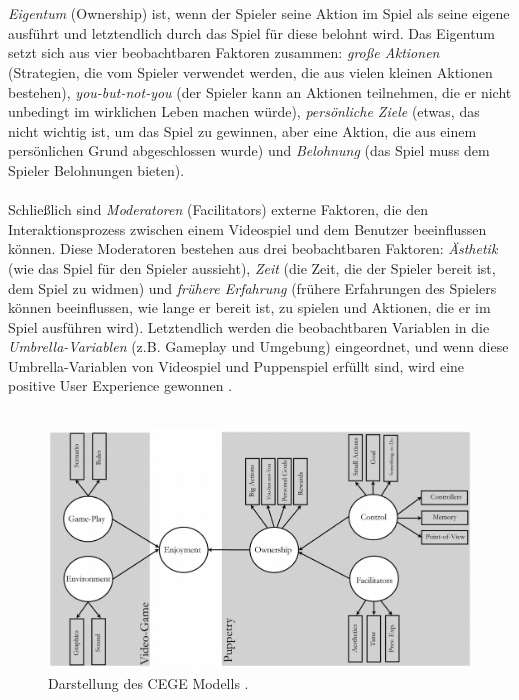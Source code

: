 \documentclass[a4paper,12pt]{scrartcl}
\begin{document}
\\\\
\textit{Eigentum} (Ownership) ist, wenn der Spieler seine Aktion im Spiel als seine eigene ausführt und letztendlich durch das Spiel für diese belohnt wird. Das Eigentum setzt sich aus vier beobachtbaren Faktoren zusammen: \textit{große Aktionen} (Strategien, die vom Spieler verwendet werden, die aus vielen kleinen Aktionen bestehen), \textit{you-but-not-you} (der Spieler kann an Aktionen teilnehmen, die er nicht unbedingt im wirklichen Leben machen würde), \textit{persönliche Ziele} (etwas, das nicht wichtig ist, um das Spiel zu gewinnen, aber eine Aktion, die aus einem persönlichen Grund abgeschlossen wurde) und \textit{Belohnung} (das Spiel muss dem Spieler Belohnungen bieten). 
\\\\
Schließlich sind \textit{Moderatoren} (Facilitators) externe Faktoren, die den Interaktionsprozess zwischen einem Videospiel und dem Benutzer beeinflussen können. Diese Moderatoren bestehen aus drei beobachtbaren Faktoren: \textit{Ästhetik} (wie das Spiel für den Spieler aussieht), \textit{Zeit} (die Zeit, die der Spieler bereit ist, dem Spiel zu widmen) und \textit{frühere Erfahrung} (frühere Erfahrungen des Spielers können beeinflussen, wie lange er bereit ist, zu spielen und Aktionen, die er im Spiel ausführen wird). Letztendlich werden die beobachtbaren Variablen in die \textit{Umbrella-Variablen} (z.B. Gameplay und Umgebung) eingeordnet, und wenn diese Umbrella-Variablen von Videospiel und Puppenspiel erfüllt sind, wird eine positive User Experience gewonnen 
\cite{CEGE2016}.
\\\\
\begin{figure}[h!]
\begin{center}
\includegraphics[scale = 0.6]{Bilder/CEGEModell.eps}
\caption{Darstellung des CEGE Modells \cite{Cege2009}.}
\label{CegeModelBild}
\end{center}
\end{figure}
\end{document}
